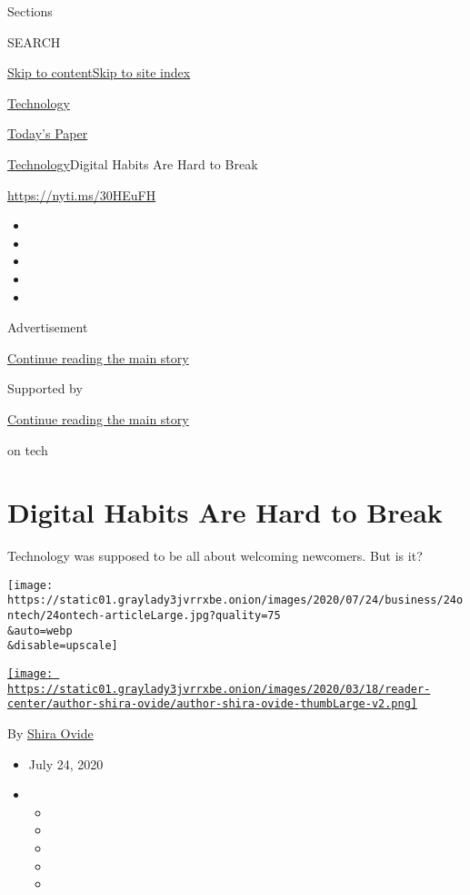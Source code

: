 Sections

SEARCH

\protect\hyperlink{site-content}{Skip to
content}\protect\hyperlink{site-index}{Skip to site index}

\href{https://www.nytimes3xbfgragh.onion/section/technology}{Technology}

\href{https://myaccount.nytimes3xbfgragh.onion/auth/login?response_type=cookie\&client_id=vi}{}

\href{https://www.nytimes3xbfgragh.onion/section/todayspaper}{Today's
Paper}

\href{/section/technology}{Technology}\textbar{}Digital Habits Are Hard
to Break

\href{https://nyti.ms/30HEuFH}{https://nyti.ms/30HEuFH}

\begin{itemize}
\item
\item
\item
\item
\item
\end{itemize}

Advertisement

\protect\hyperlink{after-top}{Continue reading the main story}

Supported by

\protect\hyperlink{after-sponsor}{Continue reading the main story}

on tech

\hypertarget{digital-habits-are-hard-to-break}{%
\section{Digital Habits Are Hard to
Break}\label{digital-habits-are-hard-to-break}}

Technology was supposed to be all about welcoming newcomers. But is it?

\texttt{[image: https://static01.graylady3jvrrxbe.onion/images/2020/07/24/business/24ontech/24ontech-articleLarge.jpg?quality=75\\\&auto=webp\\\&disable=upscale]}

\href{https://www.nytimes3xbfgragh.onion/by/shira-ovide}{\texttt{[image: https://static01.graylady3jvrrxbe.onion/images/2020/03/18/reader-center/author-shira-ovide/author-shira-ovide-thumbLarge-v2.png]}}

By \href{https://www.nytimes3xbfgragh.onion/by/shira-ovide}{Shira Ovide}

\begin{itemize}
\item
  July 24, 2020
\item
  \begin{itemize}
  \item
  \item
  \item
  \item
  \item
  \end{itemize}
\end{itemize}

